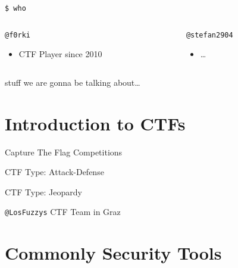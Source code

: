 \begin{frame}
  {\texttt{\$ who}}

  \begin{columns}
    \begin{column}{0.48\textwidth}
      {\texttt{@f0rki}}
      \begin{itemize}
        \item CTF Player since 2010
      \end{itemize}
    \end{column}

    \begin{column}{0.48\textwidth}
      \texttt{@stefan2904}
      \begin{itemize}
        \item \ldots
      \end{itemize}
    \end{column}
  \end{columns}

\end{frame}


\begin{frame}{stuff we are gonna be talking about\ldots}
    \tableofcontents
\end{frame}


\section{Introduction to CTFs}

\begin{frame}
  {Capture The Flag Competitions}


\end{frame}


\begin{frame}
  {CTF Type: Attack-Defense}

\end{frame}


\begin{frame}
  {CTF Type: Jeopardy}


\end{frame}

\begin{frame}
  {\texttt{@LosFuzzys} CTF Team in Graz}



\end{frame}


\section{Commonly Security Tools}

